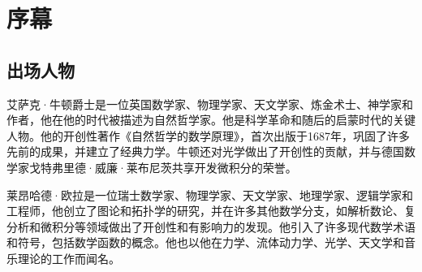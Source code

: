 \documentclass[
    fontsize=24pt, %
	twoside=false, %
	secnumdepth=0, %
    paper=b5paper, %
]{kaobook}
\begin{document}
\begingroup %

\setlength{\textheight}{230\vscale} %

\etocstandarddisplaystyle %
\etocstandardlines %

\renewcommand\contentsname{目录}
\tableofcontents %




\endgroup


\mainmatter %

\chapter{序幕}

\section{出场人物}

艾萨克·牛顿爵士是一位英国数学家、物理学家、天文学家、炼金术士、神学家和作者，他在他的时代被描述为自然哲学家。他是科学革命和随后的启蒙时代的关键人物。他的开创性著作《自然哲学的数学原理》，首次出版于1687年，巩固了许多先前的成果，并建立了经典力学。牛顿还对光学做出了开创性的贡献，并与德国数学家戈特弗里德·威廉·莱布尼茨共享开发微积分的荣誉。

莱昂哈德·欧拉是一位瑞士数学家、物理学家、天文学家、地理学家、逻辑学家和工程师，他创立了图论和拓扑学的研究，并在许多其他数学分支，如解析数论、复分析和微积分等领域做出了开创性和有影响力的发现。他引入了许多现代数学术语和符号，包括数学函数的概念。他也以他在力学、流体动力学、光学、天文学和音乐理论的工作而闻名。
\end{document}
